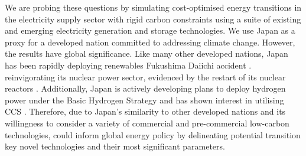 We are probing these questions by simulating cost-optimised energy transitions in the electricity supply sector with rigid carbon constraints using a suite of existing and emerging electricity generation and storage technologies. We use Japan as a proxy for a developed nation committed to addressing climate change. However, the results have global significance. Like many other developed nations, Japan has been rapidly deploying renewables     Fukushima Daiichi accident    .  reinvigorating its nuclear power sector,  evidenced by the restart of  its nuclear reactors \cite{iaea_pris_nodate}. Additionally, Japan is actively developing plans to deploy hydrogen power under the Basic Hydrogen Strategy \cite{noauthor_basic_2017} and has shown interest in utilising \gls{CCS} \cite{meti_report_2020}. Therefore, due to Japan's similarity to other developed nations and its willingness to consider a variety of commercial and pre-commercial low-carbon technologies,    could inform global energy policy  by delineating potential transition   key novel technologies  \deleted{,} and their most significant parameters.
%

